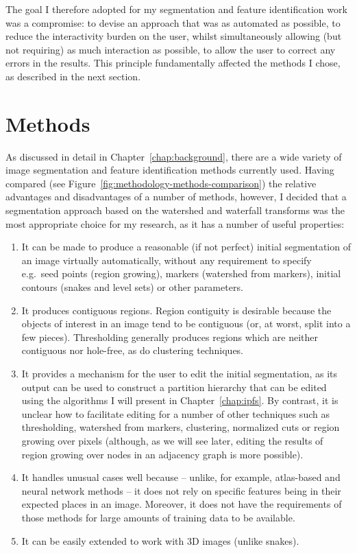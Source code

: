 The goal I therefore adopted for my segmentation and feature identification work was a compromise: to devise an approach that was as automated as possible, to reduce the interactivity burden on the user, whilst simultaneously allowing (but not requiring) as much interaction as possible, to allow the user to correct any errors in the results. This principle fundamentally affected the methods I chose, as described in the next section.

\section{Methods}

As discussed in detail in Chapter~\ref{chap:background}, there are a wide variety of image segmentation and feature identification methods currently used. Having compared (see Figure~\ref{fig:methodology-methods-comparison}) the relative advantages and disadvantages of a number of methods, however, I decided that a segmentation approach based on the watershed and waterfall transforms was the most appropriate choice for my research, as it has a number of useful properties:
%
\begin{enumerate}

\item It can be made to produce a reasonable (if not perfect) initial segmentation of an image virtually automatically, without any requirement to specify e.g.~seed points (region growing), markers (watershed from markers), initial contours (snakes and level sets) or other parameters.

\item It produces contiguous regions. Region contiguity is desirable because the objects of interest in an image tend to be contiguous (or, at worst, split into a few pieces). Thresholding generally produces regions which are neither contiguous nor hole-free, as do clustering techniques.

\item It provides a mechanism for the user to edit the initial segmentation, as its output can be used to construct a partition hierarchy that can be edited using the algorithms I will present in Chapter~\ref{chap:ipfs}. By contrast, it is unclear how to facilitate editing for a number of other techniques such as thresholding, watershed from markers, clustering, normalized cuts or region growing over pixels (although, as we will see later, editing the results of region growing over nodes in an adjacency graph is more possible).

\item It handles unusual cases well because -- unlike, for example, atlas-based and neural network methods -- it does not rely on specific features being in their expected places in an image. Moreover, it does not have the requirements of those methods for large amounts of training data to be available.

\item It can be easily extended to work with 3D images (unlike snakes).

\end{enumerate}

